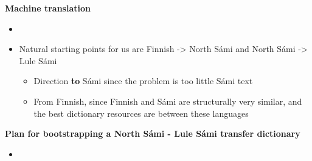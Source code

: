\documentclass[landscape,english,11pt]{seminar}
\begin{document}
\begin{slide}
\begin{itemize}
\begin{itemize}
\end{itemize}

\newslide
\textbf{Machine translation}
\begin{itemize}
\item 
\item Natural starting points for us are Finnish -> North Sámi and North Sámi -> Lule Sámi
\begin{itemize}
\item Direction \textbf{to} Sámi since the problem is too little Sámi text
\item From Finnish, since Finnish and Sámi are structurally very similar, and the best dictionary resources are between these languages
\end{itemize}
\end{itemize}


\newslide
\textbf{Plan for bootstrapping a North Sámi - Lule Sámi transfer dictionary}
\begin{itemize}
\item 
\end{itemize}




\end{slide}
\end{document}
